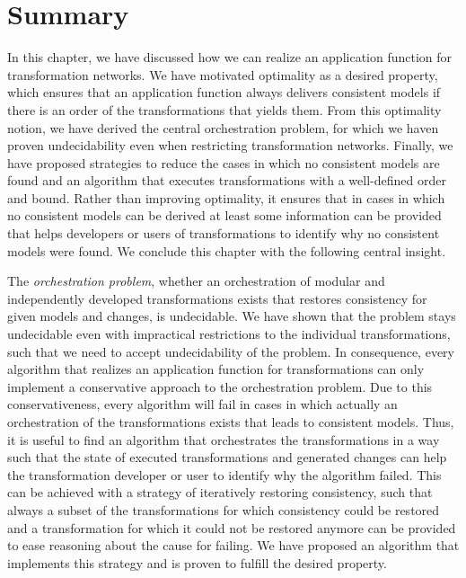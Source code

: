 \section{Summary}

In this chapter, we have discussed how we can realize an application function for transformation networks.
We have motivated optimality as a desired property, which ensures that an application function always delivers consistent models if there is an order of the transformations that yields them. 
From this optimality notion, we have derived the central orchestration problem, for which we haven proven undecidability even when restricting transformation networks.
Finally, we have proposed strategies to reduce the cases in which no consistent models are found and an algorithm that executes transformations with a well-defined order and bound.
Rather than improving optimality, it ensures that in cases in which no consistent models can be derived at least some information can be provided that helps developers or users of transformations to identify why no consistent models were found.
We conclude this chapter with the following central insight.

\begin{insight}[Orchestration]
    The \emph{orchestration problem}, whether an orchestration of modular and independently developed transformations exists that restores consistency for given models and changes, is undecidable.
    We have shown that the problem stays undecidable even with impractical restrictions to the individual transformations, such that we need to accept undecidability of the problem.
    In consequence, every algorithm that realizes an application function for transformations can only implement a conservative approach to the orchestration problem.
    Due to this conservativeness, every algorithm will fail in cases in which actually an orchestration of the transformations exists that leads to consistent models.
    Thus, it is useful to find an algorithm that orchestrates the transformations in a way such that the state of executed transformations and generated changes can help the transformation developer or user to identify why the algorithm failed.
    This can be achieved with a strategy of iteratively restoring consistency, such that always a subset of the transformations for which consistency could be restored and a transformation for which it could not be restored anymore can be provided to ease reasoning about the cause for failing.
    We have proposed an algorithm that implements this strategy and is proven to fulfill the desired property.
\end{insight}
